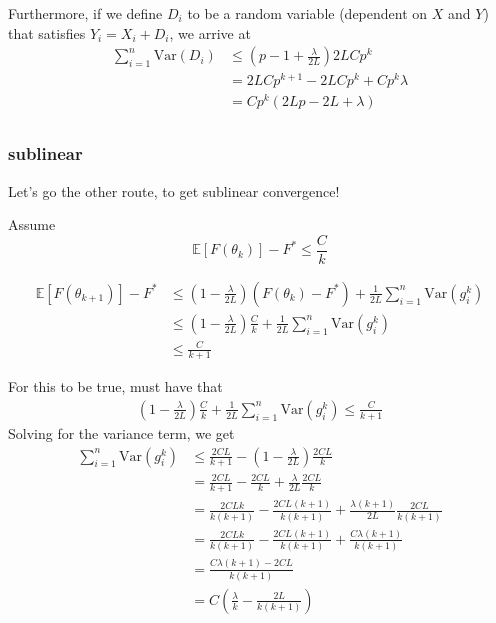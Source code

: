 \documentclass[11pt]{article}
\newcommand{\Var}{\mathrm{Var}}
\begin{document}
	Furthermore, if we define $D_i$ to be a random variable (dependent on $X$ and $Y$) that satisfies  $Y_i = X_i + D_i$, we arrive at 
	\begin{align*}
		 \sum_{i=1}^n \Var(D_i) &\leq \left( p -1 +\frac{\lambda}{2L} \right) 2LC p^k  \\
		 &= 2LC p^{k+1} -2LC p^k +C p^k\lambda \\
		 &= C p^k \left( 2L p -2L +\lambda \right)  \\
	\end{align*}
	
	
	\subsubsection{sublinear}
	Let's go the other route, to get sublinear convergence!
	
	Assume 
	\begin{equation}
		\mathbb{E} [ F(\theta_{k}) ]  - F^* \leq \frac{C}{k} 
	\end{equation}
	
	\begin{align*}
		\mathbb{E} [ F(\theta_{k+1}) ]  - F^* & \leq ( 1-\frac{\lambda}{2L})   (F(\theta_k) - F^*)+ \frac{1}{2L}\sum_{i=1}^n \Var ( g^k_i) \\
											  & \leq ( 1-\frac{\lambda}{2L})   \frac{C}{k}+ \frac{1}{2L}\sum_{i=1}^n \Var ( g^k_i)\\
											  & \leq  \frac{C}{k+1} 
	\end{align*}
	
	For this to be true, must have that 
	\begin{align*}
 ( 1-\frac{\lambda}{2L})   \frac{C}{k}+ \frac{1}{2L}\sum_{i=1}^n \Var ( g^k_i) \leq  \frac{C}{k+1} 
	\end{align*}
	Solving for the variance term, we get 
	\begin{align*}
	\sum_{i=1}^n \Var ( g^k_i) & \leq  \frac{2CL}{k+1}  -( 1-\frac{\lambda}{2L})   \frac{2CL}{k} \\
	& =  \frac{2CL}{k+1}  - \frac{2CL}{k} +  \frac{\lambda}{2L}   \frac{2CL}{k} \\
	& =  \frac{2CLk}{k(k+1)}  - \frac{2CL(k+1)}{k(k+1)} +  \frac{\lambda (k+1)}{2L}   \frac{2CL}{k(k+1)} \\
	& =  \frac{2CLk}{k(k+1)}  - \frac{2CL(k+1)}{k(k+1)} +   \frac{C\lambda (k+1)}{k(k+1)}\\
	& =   \frac{C\lambda (k+1) - 2CL}{k(k+1)} \\
	& =  C \left( \frac{\lambda}{k} - \frac{2L}{k(k+1)}\right) 
	\end{align*}
\end{document}
